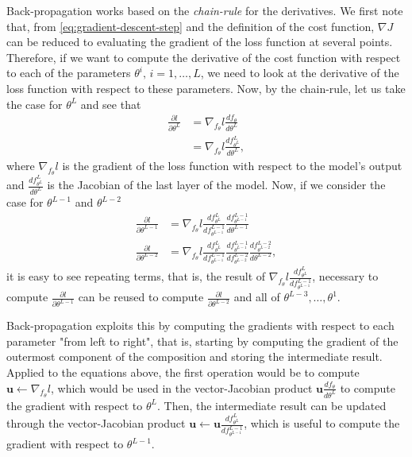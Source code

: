 Back-propagation works based on the \emph{chain-rule} for the derivatives.
We first note that, from \eqref{eq:gradient-descent-step} and the definition of the cost function, $\nabla J$ can be reduced to evaluating the gradient of the loss function at several points.
Therefore, if we want to compute the derivative of the cost function with respect to each of the parameters $\theta^i,\,i=1,\ldots,L$, we need to look at the derivative of the loss function with respect to these parameters.
Now, by the chain-rule, let us take the case for $\theta^L$ and see that
 \begin{align*}
     \frac{\partial l}{\partial\theta^L} &= \nabla_{f_\theta} l \frac{d f_\theta}{d \theta^L} \\
     &= \nabla_{f_\theta} l \frac{d f^L_{\theta^L}}{d \theta^L}
,\end{align*}
where $\nabla_{f_\theta} l$ is the gradient of the loss function with respect to the model's output and $\frac{d f^L_{\theta^L}}{d \theta^L}$ is the Jacobian of the last layer of the model. Now, if we consider the case for $\theta^{L-1}$ and $\theta^{L-2}$
 \begin{align*}
     \frac{\partial l}{\partial\theta^{L-1}} &= \nabla_{f_\theta} l \frac{d f^L_{\theta^L}}{d f^{L-1}_{\theta^{L-1}}} \frac{d f^{L-1}_{\theta^{L-1}}}{d \theta^{L-1}} \\
     \frac{\partial l}{\partial\theta^{L-2}} &= \nabla_{f_\theta} l \frac{d f^L_{\theta^L}}{d f^{L-1}_{\theta^{L-1}}} \frac{d f^{L-1}_{\theta^{L-1}}}{d f^{L-2}_{\theta^{L-2}}} \frac{d f^{L-2}_{\theta^{L-2}}}{d \theta^{L-2}}
,\end{align*}
it is easy to see repeating terms, that is, the result of $\nabla_{f_\theta} l \frac{d f^L_{\theta^L}}{d f^{L-1}_{\theta^{L-1}}}$, necessary to compute $\frac{\partial l}{\partial\theta^{L-1}}$ can be reused to compute $\frac{\partial l}{\partial\theta^{L-2}}$ and all of $\theta^{L-3},\ldots,\theta^1$.

Back-propagation exploits this by computing the gradients with respect to each parameter "from left to right", that is, starting by computing the gradient of the outermost component of the composition and storing the intermediate result.
Applied to the equations above, the first operation would be to compute $\bm{u}\gets\nabla_{f_\theta} l$, which would be used in the vector-Jacobian product $\bm{u} \frac{d f_\theta}{d \theta^L}$ to compute the gradient with respect to $\theta^{L}$.
Then, the intermediate result can be updated through the vector-Jacobian product $\bm{u}\gets \bm{u} \frac{d f^L_{\theta^L}}{d f^{L-1}_{\theta^{L-1}}}$, which is useful to compute the gradient with respect to $\theta^{L-1}$.

